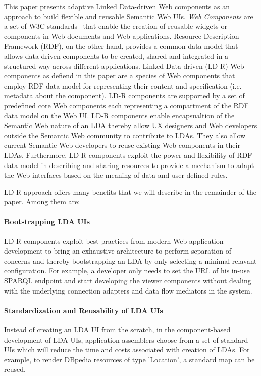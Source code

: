\documentclass{acm_proc_article-sp}
\begin{document}
This paper presents adaptive Linked Data-driven Web components as an approach to build flexible and reusable Semantic Web UIs.
\emph{Web Components} are a set of W3C standards~\cite{webcomponentsW3C} that enable the creation of reusable widgets or components in Web documents and Web applications.
Resource Description Framework (RDF), on the other hand, provides a common data model that allows data-driven components to be created, shared and integrated in a structured way across different applications.
Linked Data-driven (LD-R) Web components as defiend in this paper are a species of Web components that employ RDF data model for representing their content and specification (i.e. metadata about the component).
LD-R components are supported by a set of predefined core Web components each representing a compartment of the RDF data model on the Web UI.
LD-R components enable encapsualtion of the Semantic Web nature of an LDA thereby allow UX designers and Web developers outside the Semantic Web community to contribute to LDAs.
They also allow current Semantic Web developers to reuse existing Web components in their LDAs.
Furthermore, LD-R components exploit the power and flexibility of RDF data model in describing and sharing resources to provide a mechanism to adapt the Web interfaces based on the meaning of data and user-defined rules. 

LD-R approach offers many benefits that we will describe in the remainder of the paper. Among them are:

\paragraph{Bootstrapping LDA UIs} 
LD-R components exploit best practices from modern Web application development to bring an exhaustive architecture to perform separation of concerns and thereby bootstrapping an LDA by only selecting a minimal relavant configuration.
For example, a developer only needs to set the URL of his in-use SPARQL endpoint and start developing the viewer components without dealing with the underlying connection adapters and data flow mediators in the system.

\paragraph{Standardization and Reusability of LDA UIs} 
Instead of creating an LDA UI from the scratch, in the component-based development of LDA UIs, application assemblers choose from a set of standard UIs which will reduce the time and costs associated with creation of LDAs.
For example, to render DBpedia resources of type 'Location', a standard map can be reused.
\end{document}
